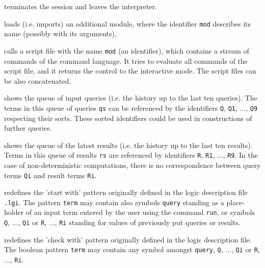 \begin{description}
  \item[{\tt quit}]   
    terminates the session and leaves the  \elan{} interpreter.
  \item
    [{\tt load mod}]  
    loads (i.e. imports) an additional module, where the identifier \verb|mod| 
    describes its name (possibly with its arguments),
  \item
    [{\tt batch mod}] 
    calls a script file with the name 
    \verb|mod| (an identifier), which contains a stream of commands
    of the command language.
    It tries to evaluate all commands of the script file, and
    it returns the control to the interactive mode.
    The script files can be also concatenated.
 \item
   [{\tt qs}]  shows the queue of input queries (i.e. the history up to the
       last ten queries).
       The terms in this queue of queries {\tt qs} can be
       referenced by the identifiers
       \verb|Q|, \verb|Q1|, ..., \verb|Q9| respecting their sorts.
       These sorted identifiers could be used in constructions of
       further queries.
 \item
   [{\tt rs}] shows the queue of the latest results 
         (i.e. the history up to the last ten results).
       Terms in this queue of results {\tt rs} are
       referenced by identifiers
       \verb|R|, \verb|R1|, ..., \verb|R9|.
       In the case of non-deterministic computations, 
       there is no correspondence between query terms
       \verb|Qi| and result terms \verb|Ri|.
  \item
    [{\tt startwith (str)term}]  
    redefines the 'start with' pattern originally defined in the 
    logic description file \verb|.lgi|.
    The pattern \verb|term| may contain also symbols
          \verb|query| standing as a place-holder of an input term
          entered by the user using the command \verb|run|,
          or symbols \verb|Q|, $\dots$, \verb|Qi| or 
          \verb|R|, $\dots$, \verb|Ri|
          standing for values of previously put queries or results.
  \item
    [{\tt checkwith term}]
    redefines the 'check with' pattern originally defined in the 
    logic description file.
    The boolean pattern \verb|term| may contain any symbol amongst
    \verb|query|, 
    \verb|Q|, $\dots$, \verb|Qi| or 
          \verb|R|, $\dots$, \verb|Ri|.
  \item

\end{description}
